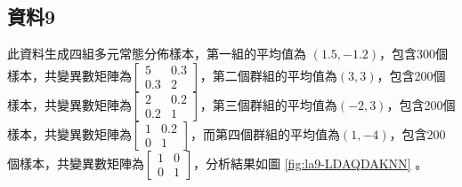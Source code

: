 \subsection{資料9}
此資料生成四組多元常態分佈樣本，第一組的平均值為 $(1.5, -1.2)$，包含300個樣本，共變異數矩陣為$\begin{bmatrix}5 & 0.3 \\0.3 & 2 \end{bmatrix}$，第二個群組的平均值為$(3, 3)$，包含200個樣本，共變異數矩陣為$\begin{bmatrix}2 & 0.2 \\0.2 & 1 \end{bmatrix}$，第三個群組的平均值為$(-2, 3)$，包含200個樣本，共變異數矩陣為$\begin{bmatrix}1 & 0.2 \\0 & 1 \end{bmatrix}$，而第四個群組的平均值為$(1, -4)$，包含200個樣本，共變異數矩陣為$\begin{bmatrix}1 & 0 \\0 & 1 \end{bmatrix}$，分析結果如圖 \ref{fig:la9-LDAQDAKNN} 。

